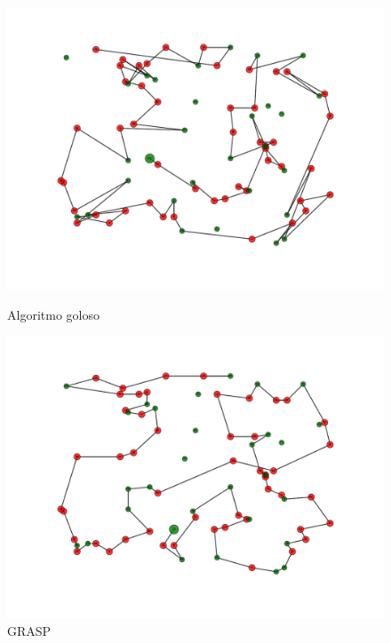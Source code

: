 \begin{figure}[H]
\centering
\begin{minipage}{0.45\textwidth}
\centering
    \includegraphics[scale=0.4]{../experimentacion/ej5/ejemplo-salidaSG.pdf}
    \caption{Algoritmo goloso}
    \label{fig:ejemplo-salidaSG}
\end{minipage}
\qquad
\begin{minipage}{0.45\textwidth}
\centering
    \includegraphics[scale=0.4]{../experimentacion/ej5/ejemplo-salidaGRASP.pdf}
    \caption{GRASP}
    \label{fig:ejemplo-salidaGRASP}
\end{minipage}
\end{figure}

